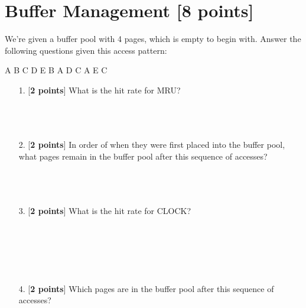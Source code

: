 \documentclass[10pt]{article}
\begin{document}
\newpage
\section{Buffer Management \textbf{[8 points]}}
We’re given a buffer pool with 4 pages, which is empty to begin with. Answer the following questions given
this access pattern:
\begin{center}
    A B C D E B A D C A E C 
\end{center}
\begin{enumerate}
    \item[1.][\textbf{2 points}] What is the hit rate for MRU?\\ \\ \\ \\
    
    \item[2.][\textbf{2 points}] In order of when they were first placed into the buffer pool, what pages remain in the buffer pool after this sequence of accesses?\\ \\ \\ \\ 
    
    \item[3.][\textbf{2 points}] What is the hit rate for CLOCK?\\ \\ \\ \\ \\ \\
    
    \item[4.][\textbf{2 points}] Which pages are in the buffer pool after this sequence of accesses?\\ \\ \\ \\ \\ \\
\end{enumerate}






\newpage
\end{document}
